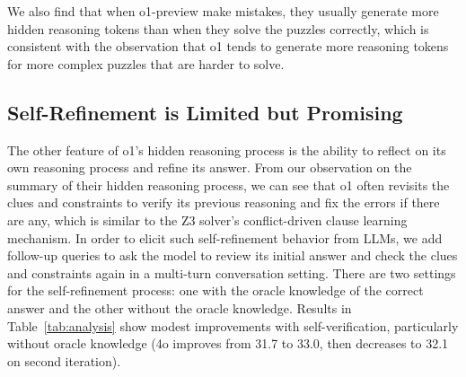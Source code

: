 




We also find that when o1-preview make mistakes, they usually generate more hidden reasoning tokens than when they solve the puzzles correctly, which is consistent with the observation that o1 tends to generate more reasoning tokens for more complex puzzles that are harder to solve.




\subsection{Self-Refinement is Limited but Promising}
\label{ssec:self_refinement}

The other feature of o1's hidden reasoning process is the ability to reflect on its own reasoning process and refine its answer.
From our observation on the summary of their hidden reasoning process, we can see that o1 often revisits the clues and constraints to verify its previous reasoning and fix the errors if there are any, which is similar to the Z3 solver's conflict-driven clause learning mechanism.
In order to elicit such self-refinement behavior from LLMs, we add follow-up queries to ask the model to review its initial answer and check the clues and constraints again in a multi-turn conversation setting. 
There are two settings for the self-refinement process: one with the oracle knowledge of the correct answer and the other without the oracle knowledge.
Results in Table~\ref{tab:analysis} show modest improvements with self-verification, particularly without oracle knowledge (4o improves from 31.7 to 33.0, then decreases to 32.1 on second iteration).

